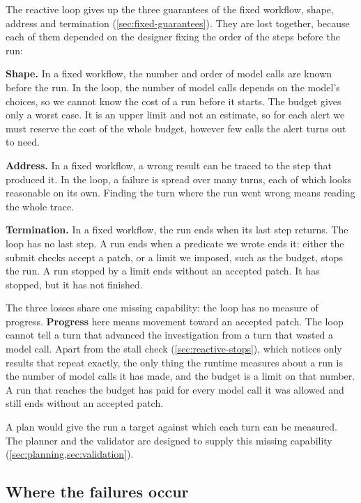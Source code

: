 The reactive loop gives up the three guarantees of the fixed workflow, shape, address and
termination (\cref{sec:fixed-guarantees}). They are lost together, because each of them depended on
the designer fixing the order of the steps before the run:
\bi
\item \textbf{Shape.} In a fixed workflow, the number and order of model calls are known before the
run. In the loop, the number of model calls depends on the model's choices, so we cannot know the
cost of a run before it starts. The budget gives only a worst case. It is an upper limit and not an
estimate, so for each alert we must reserve the cost of the whole budget, however few calls the
alert turns out to need.
\item \textbf{Address.} In a fixed workflow, a wrong result can be traced to the step that produced
it. In the loop, a failure is spread over many turns, each of which looks reasonable on its own.
Finding the turn where the run went wrong means reading the whole trace.
\item \textbf{Termination.} In a fixed workflow, the run ends when its last step returns. The loop
has no last step. A run ends when a predicate we wrote ends it: either the submit checks accept a
patch, or a limit we imposed, such as the budget, stops the run. A run stopped by a limit ends
without an accepted patch. It has stopped, but it has not finished.
\ei

The three losses share one missing capability: the loop has no measure of progress.
\textbf{Progress} here means movement toward an accepted patch. The loop cannot tell a turn that
advanced the investigation from a turn that wasted a model call. Apart from the stall check
(\cref{sec:reactive-stops}), which notices only results that repeat exactly, the only thing the
runtime measures about a run is the number of model calls it has made, and the budget is a limit on
that number. A run that reaches the budget has paid for every model call it was
allowed and still ends without an accepted patch.

A plan would give the run a target against which each turn can be measured. The planner and the
validator are designed to supply this missing capability (\cref{sec:planning,sec:validation}).

\subsection{Where the failures occur}
\label{sec:reactive-failures}

